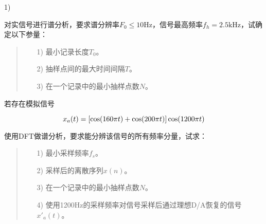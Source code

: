 \documentclass[cn, hazy, blue, normal, 14pt]{elegantnote}
\begin{document}
\begin{solution}

1) 

\end{solution}

\begin{exercise}

对实信号进行谱分析，要求谱分辨率$F_0\leq 10\text{Hz}$，信号最高频率$f_h=2.5\text{kHz}$，试确定以下参量：

\begin{quote}
\begin{itemize}
    \item[1)] 最小记录长度$T_0$。
    \item[2)] 抽样点间的最大时间间隔$T$。
    \item[3)] 在一个记录中的最小抽样点数$N$。
\end{itemize}
\end{quote}

\end{exercise}

\begin{solution}[print=true]
    


\end{solution}

\begin{exercise}

若存在模拟信号

\begin{equation}
\notag
    x_a(t)=[\cos(160\pi t)+\cos(200\pi t)]\cos(1200\pi t)
\end{equation}

使用DFT做谱分析，要求能分辨该信号的所有频率分量，试求：

\begin{quote}
\begin{itemize}
    \item[1)] 最小采样频率$f_s$。
    \item[2)] 采样后的离散序列$x(n)$。
    \item[3)] 在一个记录中的最小抽样点数$N$。
    \item[4)] 使用1200Hz的采样频率对信号采样后通过理想D/A恢复的信号$x'_a(t)$。
\end{itemize}
\end{quote}

\end{exercise}

\begin{solution}[print=true]
    


\end{solution}
\end{document}
